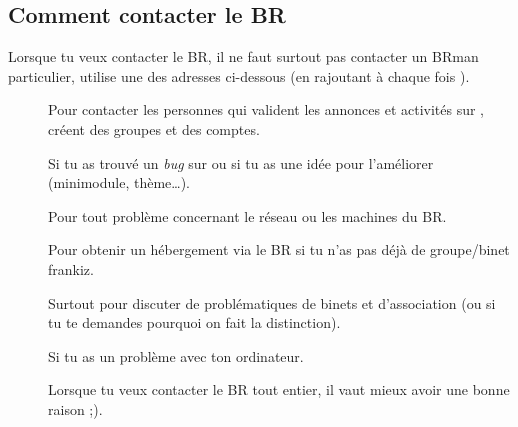 \subsection{Comment contacter le BR}

Lorsque tu veux contacter le BR, il ne faut surtout pas contacter un BRman particulier, utilise une des adresses ci-dessous (en rajoutant à chaque fois ).

\begin{description}

\item[] Pour contacter les personnes qui valident les annonces et activités sur \fkz, créent des groupes et des comptes.

\item[] Si tu as trouvé un \emph{bug} sur \fkz ou si tu as une idée pour l'améliorer (minimodule, thème\dots).

\item[] Pour tout problème concernant le réseau ou les machines du BR.

\item[] Pour obtenir un hébergement via le BR si tu n'as pas déjà de groupe/binet frankiz.



\item[] Surtout pour discuter de problématiques de binets et d'association (ou si tu te demandes pourquoi on fait la distinction). 


\item[] Si tu as un problème avec ton ordinateur.


\item[] Lorsque tu veux contacter le BR tout entier, il vaut mieux avoir une bonne raison ;).

\end{description}
